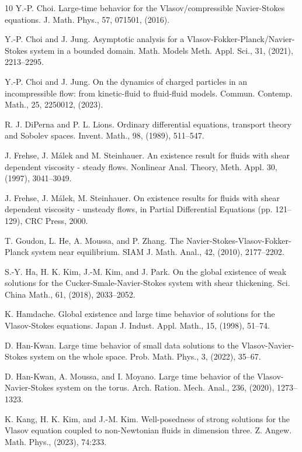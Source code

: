 \documentclass[10pt,reqno]{amsart}
\numberwithin{equation}{section}
\begin{document}
\begin{thebibliography}{10}
 Y.-P. Choi. Large-time behavior for the Vlasov/compressible Navier-Stokes equations. J. Math. Phys., 57, 071501, (2016).

 Y.-P. Choi and J. Jung. Asymptotic analysis for a Vlasov-Fokker-Planck/Navier-Stokes system in a bounded domain. Math. Models Meth. Appl. Sci., 31, (2021), 2213--2295.

 Y.-P. Choi and J. Jung. On the dynamics of charged particles in an incompressible flow: from kinetic-fluid to fluid-fluid models. Commun. Contemp. Math., 25, 2250012, (2023).

 R. J. DiPerna and P. L. Lions. Ordinary differential equations, transport theory and Sobolev spaces. Invent. Math., 98, (1989), 511--547.

 J. Frehse, J. M\'alek and M. Steinhauer. An existence result for fluids with shear dependent viscosity - steady flows. Nonlinear Anal. Theory, Meth. Appl. 30, (1997), 3041–3049.


 J. Frehse, J. M\'alek, M. Steinhauer. On existence results for fluids with shear dependent viscosity - unsteady flows, in Partial Differential Equations (pp. 121--129), CRC Press, 2000.

 T. Goudon, L. He, A. Moussa, and P. Zhang. The Navier-Stokes-Vlasov-Fokker-Planck system near equilibrium. SIAM J. Math. Anal., 42, (2010), 2177--2202.

 S.-Y. Ha, H. K. Kim, J.-M. Kim, and J. Park. On the global existence of weak solutions for the Cucker-Smale-Navier-Stokes system with shear thickening. Sci. China Math., 61, (2018), 2033--2052.

 K. Hamdache. Global existence and large time behavior of solutions for the Vlasov-Stokes equations. Japan J. Indust. Appl. Math., 15, (1998), 51--74.

 D. Han-Kwan. Large time behavior of small data solutions to the Vlasov-Navier-Stokes system on the whole space. Prob. Math. Phys., 3, (2022), 35--67.

 D. Han-Kwan, A. Moussa, and I. Moyano. Large time behavior of the Vlasov-Navier-Stokes system on the torus. Arch. Ration. Mech. Anal., 236, (2020), 1273--1323.

 K. Kang, H. K. Kim, and J.-M. Kim. Well-posedness of strong solutions for the Vlasov equation coupled to non-Newtonian fluids in dimension three. Z. Angew. Math. Phys., (2023), 74:233.


\end{thebibliography}
\end{document}
